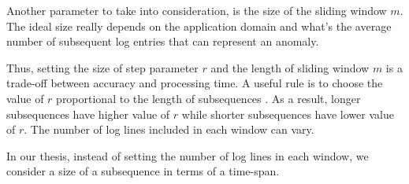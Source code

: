 Another parameter to take into consideration, is the size of the sliding window $m$. The ideal size really depends on the application domain and what's the average number of subsequent log entries that can represent an anomaly. 

Thus, setting the size of step parameter $r$ and the length of sliding window $m$ is a trade-off between accuracy and processing time. A useful rule is to choose the value of $r$ proportional to the length of subsequences \cite{izakian2013}. As a result, longer subsequences have higher value of $r$ while shorter subsequences have lower value of $r$. The number of log lines included in each window can vary. 

In our thesis, instead of setting the number of log lines in each window, we consider a size of a subsequence in terms of a time-span.

\begin{figure}[!tbp] 
\end{figure}

